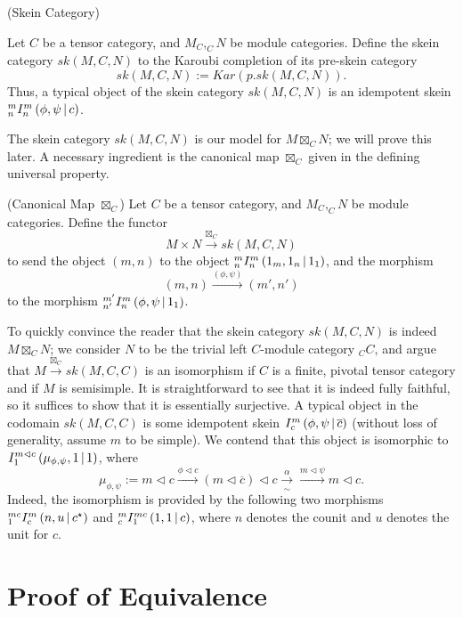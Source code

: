 \begin{definition} (Skein Category)

  \noindent Let $C$ be a tensor category, and $M_{C}, _{C}N$ be module categories.
  Define the skein category $sk(M,C,N)$ to the Karoubi completion of its pre-skein category
  \[
    sk(M,C,N) := Kar(p.sk(M,C,N)).
  \]
  \noindent Thus, a typical object of the skein category $sk(M,C,N)$ is an
  idempotent skein ${}^{m}_{n} I^{m}_{n} \left( \phi, \psi \,\middle|\, c \right)$.
\end{definition}

\noindent The skein category $sk(M,C,N)$ is our model for $M \boxtimes_{C} N$;
we will prove this later. A necessary ingredient is the canonical map
$\boxtimes_{C}$ given in the defining universal property.

\begin{definition}\label{definition/canonical-map} (Canonical Map $\boxtimes_{C}$)
  \noindent Let $C$ be a tensor category, and $M_{C}, _{C}N$ be module categories. Define the functor
  \[
    M \times N \xrightarrow{\boxtimes_{C}} sk(M,C,N)
  \]
  to send the object $(m,n)$ to the object ${}^{m}_{n} I^{m}_{n} \left( 1_{m}, 1_{n} \,\middle|\, 1_{1} \right)$, and the morphism
  \[
    (m,n) \xrightarrow{(\phi, \psi)} (m', n')
  \]
  to the morphism ${}^{m'}_{n'} I^{m}_{n} \left( \phi, \psi \,\middle|\, 1_{1} \right)$.
\end{definition}

\noindent To quickly convince the reader that the skein category $sk(M,C,N)$
is indeed $M \boxtimes_{C} N$; we consider $N$ to be the trivial left
$C$-module category $_{C}C$, and argue that
$M \xrightarrow{\boxtimes_{C}} sk(M,C,C)$ is an isomorphism if $C$ is a
finite, pivotal tensor category and if $M$ is semisimple. It is
straightforward to see that it is indeed fully faithful, so it suffices to
show that it is essentially surjective. A typical object in the codomain
$sk(M,C,C)$ is some idempotent skein ${}^{}_{} I^{m}_{c} \left( \phi, \psi \,\middle|\, \overline{c} \right)$
(without loss of generality, assume $m$ to be simple). We contend that this
object is isomorphic to ${}^{}_{} I^{m \lhd c}_{1} \left( \mu_{\phi, \psi}, 1 \,\middle|\, 1 \right)$, where
\[
  \mu_{\phi,\psi} := m \lhd c \xrightarrow{\phi \lhd c} (m \lhd \overline{c}) \lhd c \xrightarrow[\sim]{\alpha} \xrightarrow{m \lhd \psi} m \lhd c.
\]
Indeed, the isomorphism is provided by the following two morphisms
${}^{mc}_{1} I^{m}_{c} \left( n, u \,\middle|\, c^{\star} \right)$ and ${}^{m}_{c} I^{mc}_{1} \left( 1, 1 \,\middle|\, c \right)$, where $n$ denotes the counit and $u$ denotes the unit for $c$. %

\section{Proof of Equivalence}\label{section/proof-of-equivalence}

